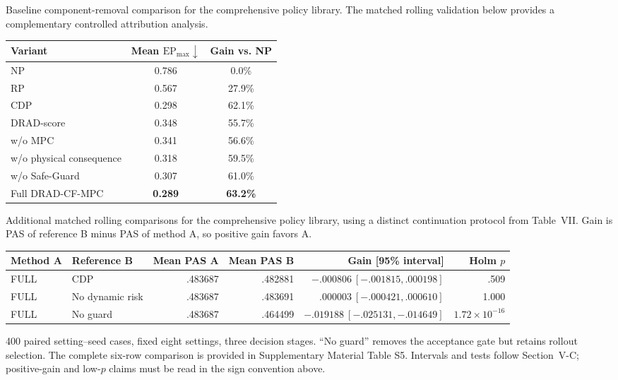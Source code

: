 \documentclass[10pt]{article}
\makeatletter
\newcommand{\best}[1]{\textbf{#1}}
\newcommand{\tablefoot}[1]{\par\vspace{3pt}\begin{minipage}{\linewidth}\footnotesize #1\end{minipage}}
\newenvironment{exporttable}{\par\noindent\begin{minipage}{\linewidth}\def\@captype{table}}{\end{minipage}\par}
\makeatother
\begin{document}
\clearpage
\setcounter{table}{6}
\begin{exporttable}
\centering
\caption{Baseline component-removal comparison for the comprehensive policy library. The matched rolling validation below provides a complementary controlled attribution analysis.}
\label{tab:incremental_contribution}
\small
\begin{tabular}{lcc}
\toprule
\rowcolor{TableHeader}
Variant & Mean $\mathrm{EP}_{\max}\downarrow$ & Gain vs. NP \\
\midrule
\rowcolor{RowWeak}
NP & 0.786 & 0.0\% \\
\rowcolor{RowNeutral}
RP & 0.567 & 27.9\% \\
\rowcolor{RowBaseline}
CDP & 0.298 & 62.1\% \\
\rowcolor{RowRisk}
DRAD-score & 0.348 & 55.7\% \\
\rowcolor{RowWeak}
w/o MPC & 0.341 & 56.6\% \\
\rowcolor{RowPhysical}
w/o physical consequence & 0.318 & 59.5\% \\
\rowcolor{RowScenario}
w/o Safe-Guard & 0.307 & 61.0\% \\
\rowcolor{RowProposed}
Full DRAD-CF-MPC & \best{0.289} & \best{63.2\%} \\
\bottomrule
\end{tabular}
\end{exporttable}
\clearpage
\setcounter{table}{7}
\begin{exporttable}
\centering\small
\caption{Additional matched rolling comparisons for the comprehensive policy library, using a distinct continuation protocol from Table~VII. Gain is PAS of reference B minus PAS of method A, so positive gain favors A.}
\label{tab:rolling_main}
\begin{tabular}{llrrrr}
\toprule
Method A & Reference B & Mean PAS A & Mean PAS B & Gain [95\% interval] & Holm $p$\\
\midrule
FULL & CDP & .483687 & .482881 & $-.000806\ [-.001815,.000198]$ & .509\\
FULL & No dynamic risk & .483687 & .483691 & $.000003\ [-.000421,.000610]$ & 1.000\\
FULL & No guard & .483687 & .464499 & $-.019188\ [-.025131,-.014649]$ & $1.72\!\times\!10^{-16}$\\
\bottomrule
\end{tabular}
\tablefoot{400 paired setting--seed cases, fixed eight settings, three decision stages. ``No guard'' removes the acceptance gate but retains rollout selection. The complete six-row comparison is provided in Supplementary Material Table S5. Intervals and tests follow Section~\mbox  {V-C}; positive-gain and low-$p$ claims must be read in the sign convention above.}
\end{exporttable}
\end{document}
